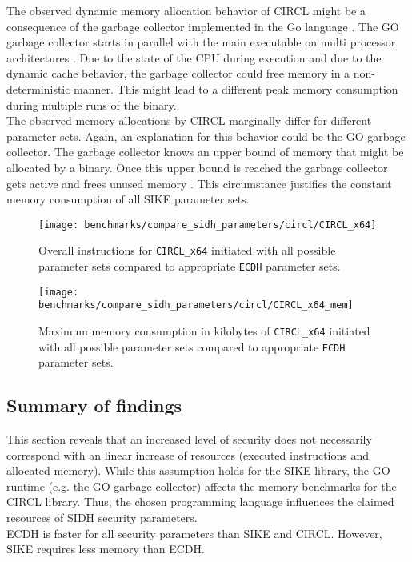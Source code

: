 The observed dynamic memory allocation behavior of \gls{CIRCL} might be a consequence of the garbage collector implemented in the Go language \parencite{Hudson:GGC}. The GO garbage collector starts in parallel with the main executable on multi processor architectures \parencite{go2020faq}. Due to the state of the CPU during execution and due to the dynamic cache behavior, the garbage collector could free memory in a non-deterministic manner. This might lead to a different peak memory consumption during multiple runs of the binary. \\
The observed memory allocations by \gls{CIRCL} marginally differ for different parameter sets. Again, an explanation for this behavior could be the GO garbage collector. The garbage collector knows an upper bound of memory that might be allocated by a binary. Once this upper bound is reached the garbage collector gets active and frees unused memory \parencite{Hudson:GGC}. This circumstance justifies the constant memory consumption of all \gls{SIKE} parameter sets.

\begin{figure}[H]
  \centering
  \texttt{[image: benchmarks/compare\_sidh\_parameters/circl/CIRCL\_x64]}
  \caption[Instructions for all parameter sets via \texttt{CIRCL\_x64}]
  {Overall instructions for \texttt{CIRCL\_x64} initiated with all possible parameter sets compared to appropriate \texttt{ECDH} parameter sets.}
  \label{fig:results_all_curves_circl}
\end{figure}

\begin{figure}[H]
  \centering
  \texttt{[image: benchmarks/compare\_sidh\_parameters/circl/CIRCL\_x64\_mem]}
  \caption[Memory consumption for all parameter sets via \texttt{CIRCL\_x64}]
  {Maximum memory consumption in kilobytes of \texttt{CIRCL\_x64} initiated with all possible parameter sets compared to appropriate \texttt{ECDH} parameter sets.}
  \label{fig:results_all_curves_circl_mem}
\end{figure}

\subsection{Summary of findings}\label{sec:findings_sidh_sec_levels}
This section reveals that an increased level of security does not necessarily correspond with an linear increase of resources (executed instructions and allocated memory). While this assumption holds for the \gls{SIKE} library, the GO runtime (e.g. the GO garbage collector) affects the memory benchmarks for the \gls{CIRCL} library. Thus, the chosen programming language influences the claimed resources of \gls{SIDH} security parameters.\\
\gls{ECDH} is faster for all security parameters than \gls{SIKE} and \gls{CIRCL}. However, \gls{SIKE} requires less memory than \gls{ECDH}.

